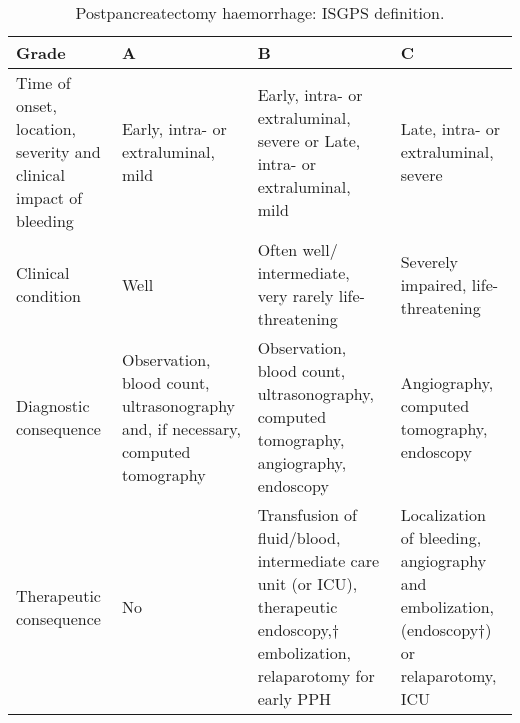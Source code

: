 \begin{sidewaystable}[htbp]
\hfill
\vfill
\caption{Postpancreatectomy haemorrhage: ISGPS definition.}
\label{table:isgps_pph}
\begin{tabular}{|m{4cm}|m{4cm}|m{5cm}|m{5cm}|}
	\hline
	Grade                                                             & A                                                                                & B                                                                                                                             & C                                                                                         \\ \hline
	Time of onset, location, severity and clinical impact of bleeding & Early, intra- or extraluminal, mild                                              & Early, intra- or extraluminal, severe	or Late, intra- or extraluminal, mild                                                   & Late, intra- or extraluminal, severe                                                      \\
	Clinical condition                                                & Well                                                                             & Often well/ intermediate, very rarely life-threatening                                                                        & Severely impaired, life-threatening                                                       \\
	Diagnostic consequence                                            & Observation, blood count, ultrasonography and, if necessary, computed tomography & Observation, blood count, ultrasonography, computed tomography, angiography, endoscopy                                        & Angiography, computed tomography, endoscopy                                               \\
	Therapeutic consequence                                           & No                                                                               & Transfusion of fluid/blood, intermediate care unit (or ICU), therapeutic endoscopy,† embolization, relaparotomy for early PPH & Localization of bleeding, angiography and embolization, (endoscopy†) or relaparotomy, ICU \\ \hline
\end{tabular}
\end{sidewaystable}